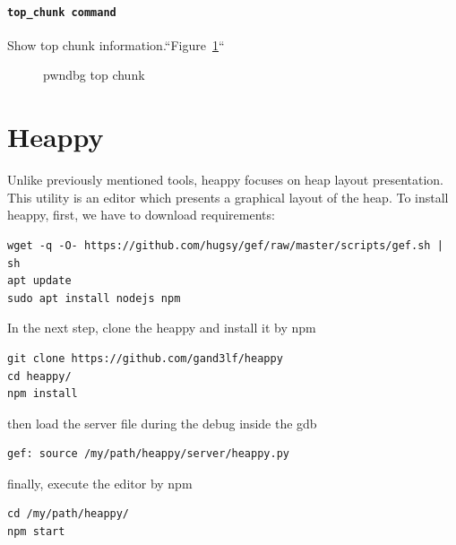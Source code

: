 \documentclass{masterthesis}
\begin{document}
\paragraph{\lstinline{top_chunk command}}

Show top chunk information.``Figure~\ref{fig:pwntopchunk}``

\begin{figure}[h!]
\caption{pwndbg top chunk}
\label{fig:pwntopchunk}
\end{figure}


\section{Heappy}
Unlike previously mentioned tools, heappy focuses on heap layout presentation. This utility is an editor which presents a graphical layout of the heap. To install heappy, first, we have to download requirements:

\begin{lstlisting}[frame=tlrb]
wget -q -O- https://github.com/hugsy/gef/raw/master/scripts/gef.sh | sh
apt update
sudo apt install nodejs npm
\end{lstlisting}

In the next step, clone the heappy and install it by npm

\begin{lstlisting}[frame=tlrb]
git clone https://github.com/gand3lf/heappy
cd heappy/
npm install
\end{lstlisting}

then load the server file during the debug inside the gdb
\begin{lstlisting}[frame=tlrb]
gef: source /my/path/heappy/server/heappy.py
\end{lstlisting}

finally, execute the editor by npm

\begin{lstlisting}[frame=tlrb]
cd /my/path/heappy/
npm start
\end{lstlisting}
\end{document}
